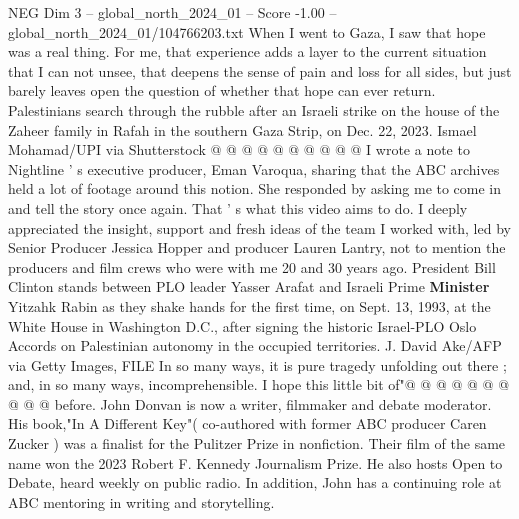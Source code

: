 \begin{textsample}{NEG Dim 3 – global\_north\_2024\_01 – Score -1.00 – global\_north\_2024\_01/104766203.txt}
When I went to Gaza, I saw that hope was a real thing.
For me, that experience adds a layer to the current situation that I can not unsee, that deepens the sense of pain and loss for all sides, but just barely leaves open the question of whether that hope can ever return.
Palestinians search through the rubble after an Israeli strike on the house of the Zaheer family in Rafah in the southern Gaza Strip, on Dec. 22, 2023.
Ismael Mohamad/UPI via Shutterstock @ @ @ @ @ @ @ @ @ @ I wrote a note to Nightline ' s executive producer, Eman Varoqua, sharing that the ABC archives held a lot of footage around this notion.
She responded by asking me to come in and tell the story once again.
That ' s what this video aims to do.
I deeply appreciated the insight, support and fresh ideas of the team I worked with, led by Senior Producer Jessica Hopper and producer Lauren Lantry, not to mention the producers and film crews who were with me 20 and 30 years ago.
President Bill Clinton stands between PLO leader Yasser Arafat and Israeli Prime \textbf{Minister} Yitzahk Rabin as they shake hands for the first time, on Sept. 13, 1993, at the White House in Washington D.C., after signing the historic Israel-PLO Oslo Accords on Palestinian autonomy in the occupied territories.
J.
David Ake/AFP via Getty Images, FILE In so many ways, it is pure tragedy unfolding out there ; and, in so many ways, incomprehensible.
I hope this little bit of"@ @ @ @ @ @ @ @ @ @ before.
John Donvan is now a writer, filmmaker and debate moderator.
His book,"In A Different Key"( co-authored with former ABC producer Caren Zucker ) was a finalist for the Pulitzer Prize in nonfiction.
Their film of the same name won the 2023 Robert F.
Kennedy Journalism Prize.
He also hosts Open to Debate, heard weekly on public radio.
In addition, John has a continuing role at ABC mentoring in writing and storytelling.

\end{textsample}
